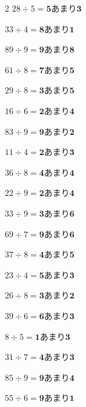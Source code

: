 \documentclass[paper=a4, fontsize=11pt, jafontsize=11pt]{jlreq}
\begin{document}
\newpage
\begin{multicols*}{2}
$ 28 \div 5 = \bm{5} 　あまり　 \bm{3}$ \vspace*{\fill} 

$ 33 \div 4 = \bm{8} 　あまり　 \bm{1}$ \vspace*{\fill} 

$ 89 \div 9 = \bm{9} 　あまり　 \bm{8}$ \vspace*{\fill} 

$ 61 \div 8 = \bm{7} 　あまり　 \bm{5}$ \vspace*{\fill} 

$ 29 \div 8 = \bm{3} 　あまり　 \bm{5}$ \vspace*{\fill} 

$ 16 \div 6 = \bm{2} 　あまり　 \bm{4}$ \vspace*{\fill} 

$ 83 \div 9 = \bm{9} 　あまり　 \bm{2}$ \vspace*{\fill} 

$ 11 \div 4 = \bm{2} 　あまり　 \bm{3}$ \vspace*{\fill} 

$ 36 \div 8 = \bm{4} 　あまり　 \bm{4}$ \vspace*{\fill} 

$ 22 \div 9 = \bm{2} 　あまり　 \bm{4}$ \vspace*{\fill} 

\columnbreak 
$ 33 \div 9 = \bm{3} 　あまり　 \bm{6}$ \vspace*{\fill} 

$ 69 \div 7 = \bm{9} 　あまり　 \bm{6}$ \vspace*{\fill} 

$ 37 \div 8 = \bm{4} 　あまり　 \bm{5}$ \vspace*{\fill} 

$ 23 \div 4 = \bm{5} 　あまり　 \bm{3}$ \vspace*{\fill} 

$ 26 \div 8 = \bm{3} 　あまり　 \bm{2}$ \vspace*{\fill} 

$ 39 \div 6 = \bm{6} 　あまり　 \bm{3}$ \vspace*{\fill} 

$ 8 \div 5 = \bm{1} 　あまり　 \bm{3}$ \vspace*{\fill} 

$ 31 \div 7 = \bm{4} 　あまり　 \bm{3}$ \vspace*{\fill} 

$ 85 \div 9 = \bm{9} 　あまり　 \bm{4}$ \vspace*{\fill} 

$ 55 \div 6 = \bm{9} 　あまり　 \bm{1}$ \vspace*{\fill} 

\end{multicols*}
\end{document}
